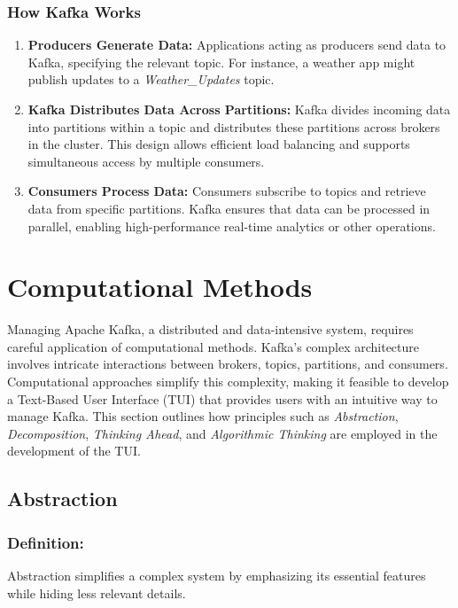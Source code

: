 \documentclass[10pt , a4paper]{report}
\begin{document}
\subsubsection*{How Kafka Works}
\begin{enumerate}
    \item \textbf{Producers Generate Data:}  
    Applications acting as producers send data to Kafka, specifying the relevant topic. For instance, a weather app might publish updates to a \textit{Weather\_Updates} topic.

    \item \textbf{Kafka Distributes Data Across Partitions:}  
    Kafka divides incoming data into partitions within a topic and distributes these partitions across brokers in the cluster. This design allows efficient load balancing and supports simultaneous access by multiple consumers.

    \item \textbf{Consumers Process Data:}  
    Consumers subscribe to topics and retrieve data from specific partitions. Kafka ensures that data can be processed in parallel, enabling high-performance real-time analytics or other operations.
\end{enumerate}

\section{Computational Methods}

Managing Apache Kafka, a distributed and data-intensive system, requires careful application of computational methods. Kafka's complex architecture involves intricate interactions between brokers, topics, partitions, and consumers. Computational approaches simplify this complexity, making it feasible to develop a Text-Based User Interface (TUI) that provides users with an intuitive way to manage Kafka. This section outlines how principles such as \textit{Abstraction}, \textit{Decomposition}, \textit{Thinking Ahead}, and \textit{Algorithmic Thinking} are employed in the development of the TUI.

\subsection{Abstraction}

\subsubsection*{Definition:}  
Abstraction simplifies a complex system by emphasizing its essential features while hiding less relevant details.
\end{document}
